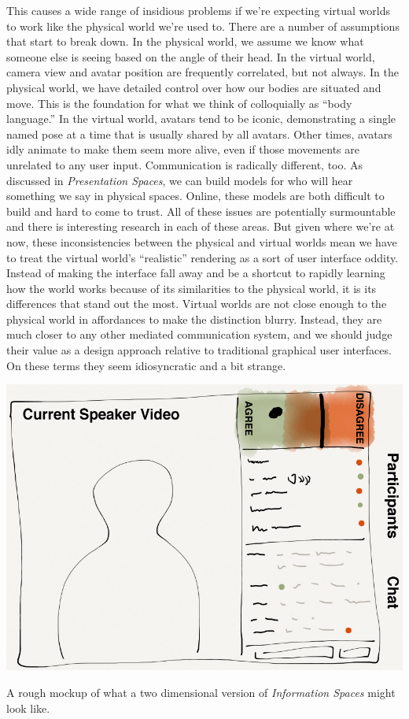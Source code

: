 This causes a wide range of insidious problems if we're expecting virtual worlds to work like the physical world we're used to. There are a number of assumptions that start to break down. In the physical world, we assume we know what someone else is seeing based on the angle of their head. In the virtual world, camera view and avatar position are frequently correlated, but not always. In the physical world, we have detailed control over how our bodies are situated and move. This is the foundation for what we think of colloquially as ``body language.'' In the virtual world, avatars tend to be iconic, demonstrating a single named pose at a time that is usually shared by all avatars. Other times, avatars idly animate to make them seem more alive, even if those movements are unrelated to any user input. Communication is radically different, too. As discussed in \emph{Presentation Spaces}, we can build models for who will hear something we say in physical spaces. Online, these models are both difficult to build and hard to come to trust. All of these issues are potentially surmountable and there is interesting research in each of these areas. But given where we're at now, these inconsistencies between the physical and virtual worlds mean we have to treat the virtual world's ``realistic'' rendering as a sort of user interface oddity. Instead of making the interface fall away and be a shortcut to rapidly learning how the world works because of its similarities to the physical world, it is its differences that stand out the most. Virtual worlds are not close enough to the physical world in affordances to make the distinction blurry. Instead, they are much closer to any other mediated communication system, and we should judge their value as a design approach relative to traditional graphical user interfaces. On these terms they seem idiosyncratic and a bit strange.

\begin{marginfigure}
	\includegraphics{figures/2d-info-spaces-mockup.png}
	\caption{A rough mockup of what a two dimensional version of \emph{Information Spaces} might look like.}
	\label{fig:infospaces_demake}
\end{marginfigure}

